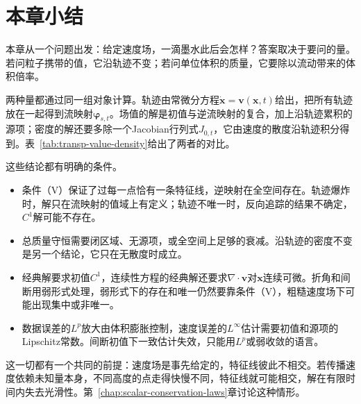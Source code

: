 \section{本章小结}
\label{sec:transp-summary}

本章从一个问题出发：给定速度场，一滴墨水此后会怎样？答案取决于要问的量。若问粒子携带的值，它沿轨迹不变；若问单位体积的质量，它要除以流动带来的体积倍率。

两种量都通过同一组对象计算。轨迹由常微分方程$\dot{\bm{x}}=\bm{v}(\bm{x},t)$给出，把所有轨迹放在一起得到流映射$\bm{\varphi}_{s,t}$。场值的解是初值与逆流映射的复合，加上沿轨迹累积的源项；密度的解还要多除一个Jacobian行列式$J_{0,t}$，它由速度的散度沿轨迹积分得到。表~\ref{tab:transp-value-density}给出了两者的对比。

这些结论都有明确的条件。

\begin{itemize}
  \item 条件（V）保证了过每一点恰有一条特征线，逆映射在全空间存在。轨迹爆炸时，解只在流映射的值域上有定义；轨迹不唯一时，反向追踪的结果不确定，$C^{1}$解可能不存在。
  \item 总质量守恒需要闭区域、无源项，或全空间上足够的衰减。沿轨迹的密度不变是另一个结论，它只在无散度时成立。
  \item 经典解要求初值$C^{1}$，连续性方程的经典解还要求$\nabla\cdot\bm{v}$对$\bm{x}$连续可微。折角和间断用弱形式处理，弱形式下的存在和唯一仍然要靠条件（V），粗糙速度场下可能出现集中或非唯一。
  \item 数据误差的$L^{p}$放大由体积膨胀控制，速度误差的$L^{\infty}$估计需要初值和源项的Lipschitz常数。间断初值下一致估计失效，只能用$L^{p}$或弱收敛的语言。
\end{itemize}

这一切都有一个共同的前提：速度场是事先给定的，特征线彼此不相交。若传播速度依赖未知量本身，不同高度的点走得快慢不同，特征线就可能相交，解在有限时间内失去光滑性。第~\ref{chap:scalar-conservation-laws}章讨论这种情形。
